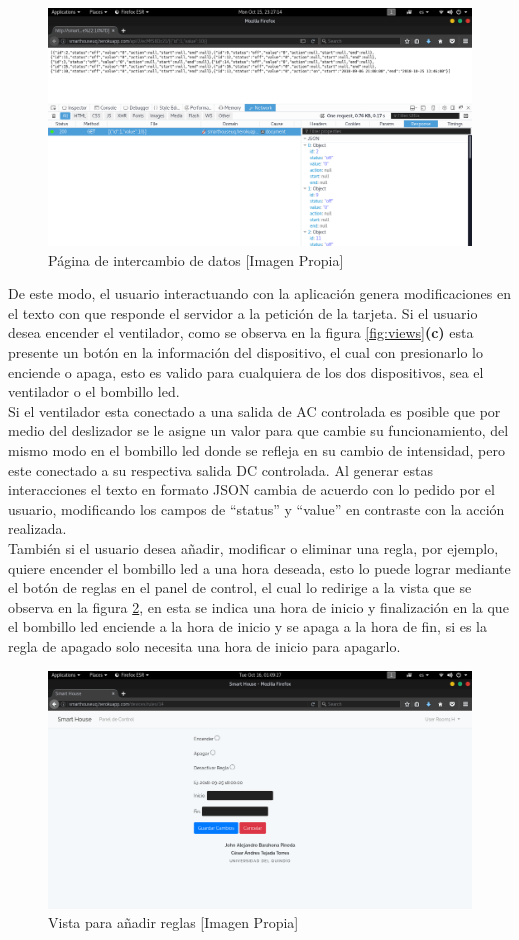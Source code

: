 \begin{figure}[H]
	\centering
	\caption{Página de intercambio de datos [Imagen Propia]}
	\label{fig:updateview}
	\includegraphics[width=0.7\linewidth]{Imagenes/Update_view}
\end{figure}

De este modo, el usuario interactuando con la aplicación genera modificaciones en el texto con que responde el servidor a la petición de la tarjeta. Si el usuario desea encender el ventilador, como se observa en la figura \ref{fig:views}\textbf{(c)} esta presente un botón en la información del dispositivo, el cual con presionarlo lo enciende o apaga, esto es valido para cualquiera de los dos dispositivos, sea el ventilador o el bombillo led.\\

Si el ventilador esta conectado a una salida de AC controlada es posible que por medio del deslizador se le asigne un valor para que cambie su funcionamiento, del mismo modo en el bombillo led donde se refleja en su cambio de intensidad, pero este conectado a su respectiva salida DC controlada. Al generar estas interacciones el texto en formato JSON cambia de acuerdo con lo pedido por el usuario, modificando los campos de ``status'' y ``value'' en contraste con la acción realizada.\\ 

También si el usuario desea añadir, modificar o eliminar una regla, por ejemplo, quiere encender el bombillo led a una hora deseada, esto lo puede lograr mediante el botón de reglas en el panel de control, el cual lo redirige a la vista que se observa en la figura \ref{fig:rulesview}, en esta se indica una hora de inicio y finalización en la que el bombillo led enciende a la hora de inicio y se apaga a la hora de fin, si es la regla de apagado solo necesita una hora de inicio para apagarlo.\\

\begin{figure}[H]
	\centering
	\caption{Vista para añadir reglas [Imagen Propia]}
	\label{fig:rulesview}
	\includegraphics[width=0.6\linewidth]{Imagenes/rules_view}
\end{figure}

